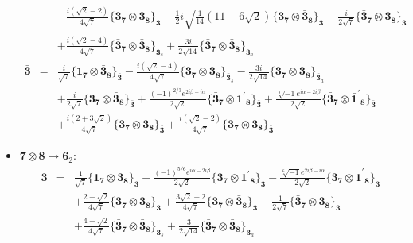 \documentclass[english]{article}
\newcommand{\subcg}[3]{\big\{ {#1}\otimes{#2}\big\}^{}_{#3}}
\newcommand{\rep}[1]{\mathbf{#1}}
\begin{document}
\begin{itemize}
\begin{eqnarray*}
 & & -\frac{i \left(\sqrt{2}-2\right)}{4 \sqrt{7}}\subcg{\rep{3}_{\rep{7}}}{\rep{3}_{\rep{8}}}{\rep{3}}-\frac{1}{2} i \sqrt{\frac{1}{14} \left(11+6 \sqrt{2}\right)}\subcg{\rep{3}_{\rep{7}}}{\rep{\bar{3}}_{\rep{8}}}{\rep{3}}-\frac{i}{2 \sqrt{7}}\subcg{\rep{\bar{3}}_{\rep{7}}}{\rep{3}_{\rep{8}}}{\rep{3}} \\ 
 & & +\frac{i \left(\sqrt{2}-4\right)}{4 \sqrt{7}}\subcg{\rep{\bar{3}}_{\rep{7}}}{\rep{\bar{3}}_{\rep{8}}}{\rep{3}_{s}}+\frac{3 i}{2 \sqrt{14}}\subcg{\rep{\bar{3}}_{\rep{7}}}{\rep{\bar{3}}_{\rep{8}}}{\rep{3}_{a}}
\\
\rep{\bar{3}} &=& \frac{i}{\sqrt{7}}\subcg{\rep{1}_{\rep{7}}}{\rep{\bar{3}}_{\rep{8}}}{\rep{\bar{3}}}-\frac{i \left(\sqrt{2}-4\right)}{4 \sqrt{7}}\subcg{\rep{3}_{\rep{7}}}{\rep{3}_{\rep{8}}}{\rep{\bar{3}}_{s}}-\frac{3 i}{2 \sqrt{14}}\subcg{\rep{3}_{\rep{7}}}{\rep{3}_{\rep{8}}}{\rep{\bar{3}}_{a}} \\ 
 & & +\frac{i}{2 \sqrt{7}}\subcg{\rep{3}_{\rep{7}}}{\rep{\bar{3}}_{\rep{8}}}{\rep{\bar{3}}}+\frac{(-1)^{2/3} e^{2 i \beta -i \alpha }}{2 \sqrt{2}}\subcg{\rep{\bar{3}}_{\rep{7}}}{\rep{1^{\prime}}_{\rep{8}}}{\rep{\bar{3}}}+\frac{\sqrt[3]{-1} e^{i \alpha -2 i \beta }}{2 \sqrt{2}}\subcg{\rep{\bar{3}}_{\rep{7}}}{\rep{\bar{1}^{\prime}}_{\rep{8}}}{\rep{\bar{3}}} \\ 
 & & +\frac{i \left(2+3 \sqrt{2}\right)}{4 \sqrt{7}}\subcg{\rep{\bar{3}}_{\rep{7}}}{\rep{3}_{\rep{8}}}{\rep{\bar{3}}}+\frac{i \left(\sqrt{2}-2\right)}{4 \sqrt{7}}\subcg{\rep{\bar{3}}_{\rep{7}}}{\rep{\bar{3}}_{\rep{8}}}{\rep{\bar{3}}}
\end{eqnarray*}
\item $\rep{7}\otimes\rep{8}\to\rep{6}_{2}$:
\begin{eqnarray*}
\rep{3} &=& \frac{1}{\sqrt{7}}\subcg{\rep{1}_{\rep{7}}}{\rep{3}_{\rep{8}}}{\rep{3}}+\frac{(-1)^{5/6} e^{i \alpha -2 i \beta }}{2 \sqrt{2}}\subcg{\rep{3}_{\rep{7}}}{\rep{1^{\prime}}_{\rep{8}}}{\rep{3}}-\frac{\sqrt[6]{-1} e^{2 i \beta -i \alpha }}{2 \sqrt{2}}\subcg{\rep{3}_{\rep{7}}}{\rep{\bar{1}^{\prime}}_{\rep{8}}}{\rep{3}} \\ 
 & & +\frac{2+\sqrt{2}}{4 \sqrt{7}}\subcg{\rep{3}_{\rep{7}}}{\rep{3}_{\rep{8}}}{\rep{3}}+\frac{3 \sqrt{2}-2}{4 \sqrt{7}}\subcg{\rep{3}_{\rep{7}}}{\rep{\bar{3}}_{\rep{8}}}{\rep{3}}-\frac{1}{2 \sqrt{7}}\subcg{\rep{\bar{3}}_{\rep{7}}}{\rep{3}_{\rep{8}}}{\rep{3}} \\ 
 & & +\frac{4+\sqrt{2}}{4 \sqrt{7}}\subcg{\rep{\bar{3}}_{\rep{7}}}{\rep{\bar{3}}_{\rep{8}}}{\rep{3}_{s}}+\frac{3}{2 \sqrt{14}}\subcg{\rep{\bar{3}}_{\rep{7}}}{\rep{\bar{3}}_{\rep{8}}}{\rep{3}_{a}}

\end{eqnarray*}
\end{itemize}
\end{document}
